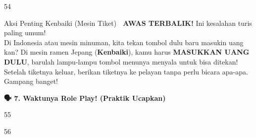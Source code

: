 \begin{convobox}{54}
    \noindent

    \vspace{1.5em}
\end{convobox}

\begin{lessonbox}{Aksi Penting Kenbaiki (Mesin Tiket) 🚨}
    \textbf{AWAS TERBALIK!} Ini kesalahan turis paling umum! \\
    Di Indonesia atau mesin minuman, kita tekan tombol dulu baru masukin uang kan? Di mesin ramen Jepang (\textbf{Kenbaiki}), kamu harus \textbf{MASUKKAN UANG DULU}, barulah lampu-lampu tombol menunya menyala untuk bisa ditekan! Setelah tiketnya keluar, berikan tiketnya ke pelayan tanpa perlu bicara apa-apa. Gampang banget!
\end{lessonbox}

\vspace{2em}
\begin{tcolorbox}[colback=boxframe, colframe=boxframe, rounded corners, boxrule=0pt, arc=3mm, left=2mm, top=2mm, bottom=2mm]
    \Large \bfseries \color{white} 🗣️ 7. Waktunya Role Play! (Praktik Ucapkan)
\end{tcolorbox}
\vspace{1em}

\begin{convobox}{55}
    \noindent
     

    \vspace{1.5em}
\end{convobox}

\begin{convobox}{56}
    \noindent
      

    \vspace{1.5em}
\end{convobox}

